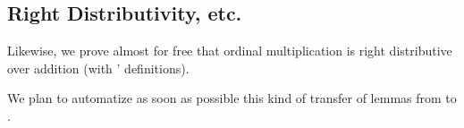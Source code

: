  \subsection{Right Distributivity, etc.}
 Likewise, we prove almost for free that ordinal multiplication is right distributive over addition (with \HydrasLib' definitions).


We plan to automatize as soon as possible this kind of transfer of lemmas from \gaia to \HydrasLib.















